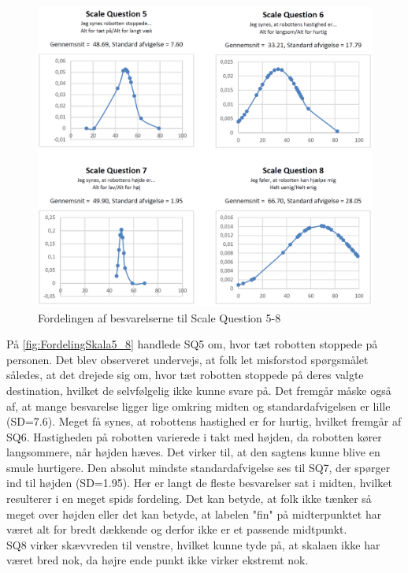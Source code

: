 %
\begin{figure}[H]
\centering
\includegraphics[width =\textwidth]{Figure/DatabehandlingSkalaer/FordelingSkala5_8} 
\caption{Fordelingen af besvarelserne til Scale Question 5-8}
\label{fig:FordelingSkala5_8}
\end{figure}
\noindent
%
På \autoref{fig:FordelingSkala5_8} handlede SQ5 om, hvor tæt robotten stoppede på personen. Det blev observeret undervejs, at folk let misforstod spørgsmålet således, at det drejede sig om, hvor tæt robotten stoppede på deres valgte destination, hvilket de selvfølgelig ikke kunne svare på. Det fremgår måske også af, at mange besvarelse ligger lige omkring midten og standardafvigelsen er lille (SD=7.6). Meget få synes, at robottens hastighed er for hurtig, hvilket fremgår af SQ6.  Hastigheden på robotten varierede i takt med højden, da robotten kører langsommere, når højden hæves. Det virker til, at den sagtens kunne blive en smule hurtigere. Den absolut mindste standardafvigelse ses til SQ7, der spørger ind til højden (SD=1.95). Her er langt de fleste besvarelser sat i midten, hvilket resulterer i en meget spids fordeling. Det kan betyde, at folk ikke tænker så meget over højden eller det kan betyde, at labelen "fin" på midterpunktet har været alt for bredt dækkende og derfor ikke er et passende midtpunkt.\\
SQ8 virker skævvreden til venstre, hvilket kunne tyde på, at skalaen ikke har været bred nok, da højre ende punkt ikke virker ekstremt nok.
